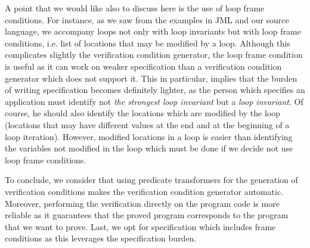 A point that we would like also to discuss here  is the use of loop frame conditions. 
For instance, as  we saw from the examples in JML and our source language, we accompany loops not only with 
loop invariants but with loop frame conditions, i.e. list of locations that may be modified by a loop.
Although this complicates slightly the verification condition generator, the loop frame condition is useful as it can work 
on weaker specification than a verification condition generator which does not support it. This in particular, implies that the burden of writing specification 
becomes definitely lighter, as the person which specifies an application must identify not  \textit{the strongest loop invariant }
but a \textit{loop invariant}. Of course, he should also identify  the locations which are modified by the loop (locations that may have different values 
at the end and at the beginning of a loop iteration). However, modified locations in a loop is easier than identifying the variables not modified in the loop which 
must be done if we decide not use loop frame conditions. 

To conclude, we  consider that  using predicate transformers for the generation of verification conditions makes the verification condition generator automatic. Moreover, 
     performing the verification directly on the program code is more reliable as it guarantees that the proved program corresponds to the program that we want to prove.
Last, we opt for specification which includes frame conditions as this leverages the specification burden.  
